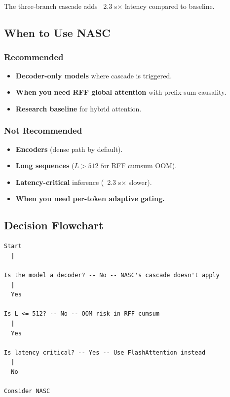The three-branch cascade adds ~2.3 s$\times$ latency compared to baseline.

\subsection{When to Use NASC}

\subsubsection{Recommended}

\begin{itemize}
\item \textbf{Decoder-only models} where cascade is triggered.
\item \textbf{When you need RFF global attention} with prefix-sum causality.
\item \textbf{Research baseline} for hybrid attention.

\end{itemize}
\subsubsection{Not Recommended}

\begin{itemize}
\item \textbf{Encoders} (dense path by default).
\item \textbf{Long sequences} ($L > 512$ for RFF cumsum OOM).
\item \textbf{Latency-critical} inference (~2.3 s$\times$ slower).
\item \textbf{When you need per-token adaptive gating.}

\end{itemize}
\subsection{Decision Flowchart}

\begin{lstlisting}
Start
  |
   
Is the model a decoder? -- No -- NASC's cascade doesn't apply
  |
  Yes
   
Is L <= 512? -- No -- OOM risk in RFF cumsum
  |
  Yes
   
Is latency critical? -- Yes -- Use FlashAttention instead
  |
  No
   
Consider NASC
\end{lstlisting}

